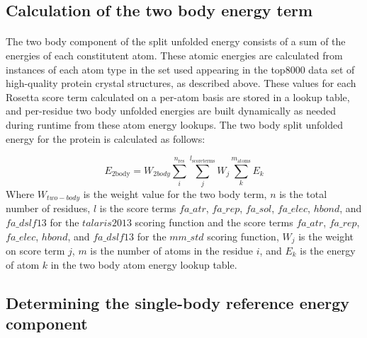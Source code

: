 \subsection{Calculation of the two body energy term}
\paragraph{}
The two body component of the split unfolded energy consists of a sum of the energies of each constitutent atom. These atomic energies are calculated from instances of each atom type in the set used appearing in the top8000 data set of high-quality protein crystal structures, as described above. These values for each Rosetta score term calculated on a per-atom basis are stored in a lookup table, and per-residue two body unfolded energies are built dynamically as needed during runtime from these atom energy lookups. The two body split unfolded energy for the protein is calculated as follows:

\begin{equation}
E_{\text{2body}} = W_{2body} \sum_{i}^{n_{\text{res}}} \sum_{j}^{l_{\text{scoreterms}}} W_{j} \sum_{k}^{m_{\text{atoms}}} E_{k}
\end{equation}
Where $W_{two-body}$ is the weight value for the two body term, $n$ is the total number of residues, $l$ is the score terms $fa\_atr$, $fa\_rep$, $fa\_sol$, $fa\_elec$, $hbond$, and $fa\_dslf13$ for the $talaris2013$ scoring function and the score terms $fa\_atr$, $fa\_rep$, $fa\_elec$, $hbond$, and $fa\_dslf13$ for the $mm\_std$ scoring function, $W_{j}$ is the weight on score term $j$, $m$ is the number of atoms in the residue $i$, and $E_{k}$ is the energy of atom $k$ in the two body atom energy lookup table.


\subsection{Determining the single-body reference energy component}
